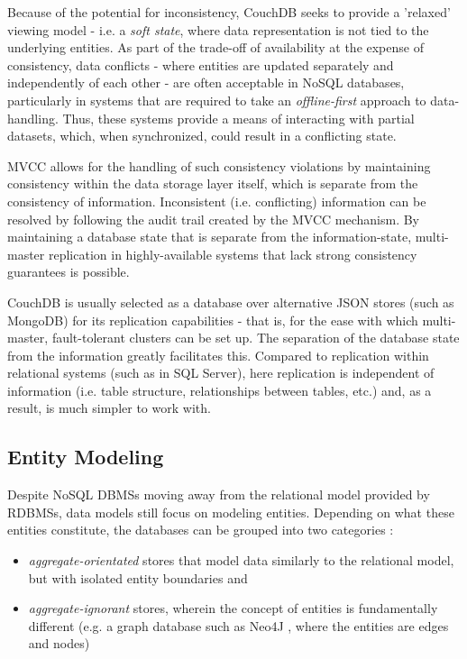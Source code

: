 Because of the potential for inconsistency, CouchDB seeks to provide a 'relaxed' viewing model - i.e. a \textit{soft state}, where data representation is not tied to the underlying entities. As part of the trade-off of availability at the expense of consistency, data conflicts - where entities are updated separately and independently of each other - are often acceptable in NoSQL databases, particularly in systems that are required to take an \textit{offline-first} approach to data-handling. Thus, these systems provide a means of interacting with partial datasets, which, when synchronized, could result in a conflicting state.

MVCC allows for the handling of such consistency violations by maintaining consistency within the data storage layer itself, which is separate from the consistency of information. Inconsistent (i.e. conflicting) information can be resolved by following the audit trail created by the MVCC mechanism. By maintaining a database state that is separate from the information-state, multi-master replication in highly-available systems that lack strong consistency guarantees is possible.

CouchDB is usually selected as a database over alternative JSON stores (such as MongoDB) for its replication capabilities - that is, for the ease with which multi-master, fault-tolerant clusters can be set up. The separation of the database state from the information greatly facilitates this. Compared to replication within relational systems (such as in SQL Server), here replication is independent of information (i.e. table structure, relationships between tables, etc.) and, as a result, is much simpler to work with.

\subsection{Entity Modeling}
Despite NoSQL DBMSs moving away from the relational model provided by RDBMSs, data models still focus on modeling entities. Depending on what these entities constitute, the databases can be grouped into two categories \cite{fowlerAggregate}:

\begin{itemize}
    \item \textit{aggregate-orientated} stores that model data similarly to the relational model, but with isolated entity boundaries and
    \item \textit{aggregate-ignorant} stores, wherein the concept of entities is fundamentally different (e.g. a graph database such as Neo4J \cite{sadalage2012}, where the entities are edges and nodes)
\end{itemize}

